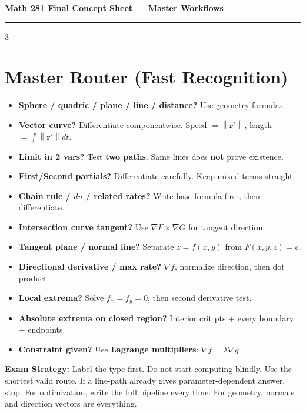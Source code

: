 \documentclass[12pt, landscape]{article}
\newcommand{\vct}[1]{\bm{#1}}
\newcommand{\norm}[1]{\left\lVert#1\right\rVert}
\newcommand{\grad}{\nabla}
\begin{document}
\vspace*{\fill}
	
	{\Large\bfseries Math 281 Final Concept Sheet --- Master Workflows}\par
	\vspace{-0.35em}\hrule\vspace{0.18em}
	
	\begin{multicols}{3}
		\raggedright
		
		\section{Master Router (Fast Recognition)}
		\begin{itemize}
			\item \textbf{Sphere / quadric / plane / line / distance?} Use geometry formulas.
			\item \textbf{Vector curve?} Differentiate componentwise. Speed $=\norm{\vct r'}$, length $=\int \norm{\vct r'}dt$.
			\item \textbf{Limit in 2 vars?} Test \textbf{two paths}. Same lines does \textbf{not} prove existence.
			\item \textbf{First/Second partials?} Differentiate carefully. Keep mixed terms straight.
			\item \textbf{Chain rule / $du$ / related rates?} Write base formula first, then differentiate.
			\item \textbf{Intersection curve tangent?} Use \textbf{$\grad F\times\grad G$} for tangent direction.
			\item \textbf{Tangent plane / normal line?} Separate \textbf{$z=f(x,y)$} from \textbf{$F(x,y,z)=c$}.
			\item \textbf{Directional derivative / max rate?} $\grad f$, normalize direction, then dot product.
			\item \textbf{Local extrema?} Solve $f_x=f_y=0$, then second derivative test.
			\item \textbf{Absolute extrema on closed region?} Interior crit pts + every boundary + endpoints.
			\item \textbf{Constraint given?} Use \textbf{Lagrange multipliers}: $\grad f=\lambda \grad g$.
		\end{itemize}
		
		\textbf{Exam Strategy:} Label the type first. Do not start computing blindly. Use the shortest valid route. If a line-path already gives parameter-dependent answer, stop. For optimization, write the full pipeline every time. For geometry, normals and direction vectors are everything.
		

\end{multicols}
\end{document}
